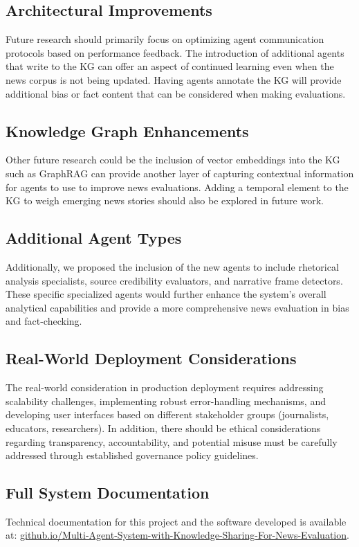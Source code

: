\documentclass[11pt]{article}
\begin{document}
\subsection{Architectural Improvements}
Future research should primarily focus on optimizing agent communication protocols based on performance feedback. The introduction of additional agents that write to the KG can offer an aspect of continued learning even when the news corpus is not being updated. Having agents annotate the KG will provide additional bias or fact content that can be considered when making evaluations. 

\subsection{Knowledge Graph Enhancements}
Other future research could be the inclusion of vector embeddings into the KG such as GraphRAG can provide another layer of capturing contextual information for agents to use to improve news evaluations. Adding a temporal element to the KG to weigh emerging news stories should also be explored in future work.

\subsection{Additional Agent Types}
Additionally, we proposed the inclusion of the new agents to include rhetorical analysis specialists, source credibility evaluators, and narrative frame detectors. These specific specialized agents would further enhance the system’s overall analytical capabilities and provide a more comprehensive news evaluation in bias and fact-checking.

\subsection{Real-World Deployment Considerations}
The real-world consideration in production deployment requires addressing scalability challenges, implementing robust error-handling mechanisms, and developing user interfaces based on different stakeholder groups (journalists, educators, researchers). In addition, there should be ethical considerations regarding transparency, accountability, and potential misuse must be carefully addressed through established governance policy guidelines.
 
\subsection{Full System Documentation}
Technical documentation for this project and the software developed is available at:  
\href{https://modupeolawuraola.github.io/Multi-Agent-System-with-Knowledge-Sharing-For-News-Evaluation/architecture.html}{github.io/Multi-Agent-System-with-Knowledge-Sharing-For-News-Evaluation}.



\end{document}
